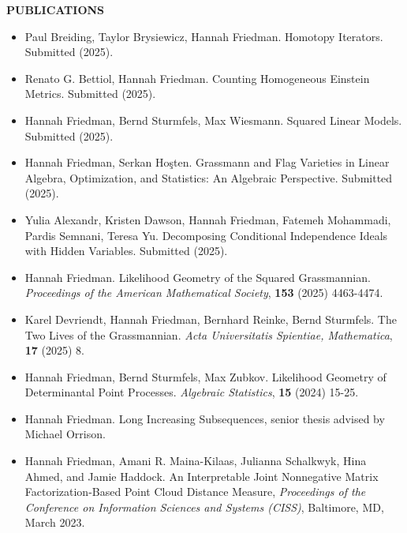 \documentclass[11pt]{article}
\newcommand{\hdr}[1]{\textcolor{blue(ryb)}{\textbf{#1}}}
\begin{document}
\bigskip

\hdr{PUBLICATIONS}\\
\begin{itemize}
\item Paul Breiding, Taylor Brysiewicz, Hannah Friedman.
  Homotopy Iterators.
  Submitted (2025). 
\item Renato G. Bettiol, Hannah Friedman.
  Counting Homogeneous Einstein Metrics.
  Submitted (2025). 
\item Hannah Friedman, Bernd Sturmfels, Max Wiesmann.
  Squared Linear Models.
  Submitted (2025). 
\item Hannah Friedman, Serkan Ho\c{s}ten.
  Grassmann and Flag Varieties in Linear Algebra, Optimization, and Statistics: An Algebraic Perspective.
  Submitted (2025).
\item Yulia Alexandr, Kristen Dawson, Hannah Friedman, Fatemeh Mohammadi, Pardis Semnani, Teresa Yu.
  Decomposing Conditional Independence Ideals with Hidden Variables. Submitted (2025).
\item Hannah Friedman.
  Likelihood Geometry of the Squared Grassmannian. \textit{Proceedings of the American Mathematical Society}, \textbf{153} (2025) 4463-4474.
  \item Karel Devriendt, Hannah Friedman, Bernhard Reinke, Bernd Sturmfels.
    The Two Lives of the Grassmannian.
    \textit{Acta Universitatis Spientiae, Mathematica}, \textbf{17} (2025) 8. 
\item Hannah Friedman, Bernd Sturmfels, Max Zubkov.
  Likelihood Geometry of Determinantal Point Processes.
  \emph{Algebraic Statistics}, \textbf{15} (2024) 15-25.
\item Hannah Friedman. Long Increasing Subsequences, senior thesis advised by Michael Orrison. 
\item Hannah Friedman, Amani R. Maina-Kilaas, Julianna Schalkwyk, Hina Ahmed, and Jamie Haddock. 
  An Interpretable Joint Nonnegative Matrix Factorization-Based Point Cloud Distance Measure, \emph{Proceedings of the Conference on Information Sciences and Systems (CISS)}, Baltimore, MD, March 2023.
\end{itemize}

\bigskip
\end{document}

